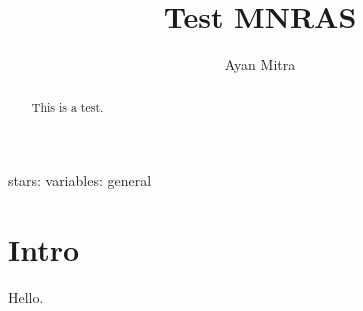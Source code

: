 \documentclass[fleqn,usenatbib]{mnras}
\title[Test]{Test MNRAS}
\author[Mitra]{Ayan Mitra}
\begin{document}
\label{firstpage}
\pagerange{\pageref{firstpage}--\pageref{lastpage}}
\maketitle
\begin{abstract}
This is a test.
\end{abstract}
\begin{keywords}
stars: variables: general
\end{keywords}
\section{Intro}
Hello.
\label{lastpage}
\end{document}
